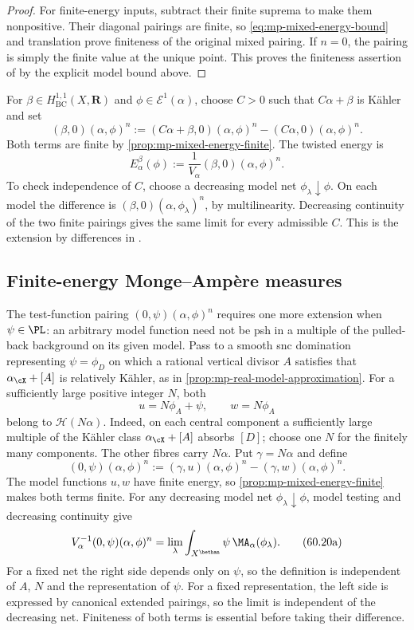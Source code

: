 \begin{proof}
For finite-energy inputs, subtract their finite suprema to make them nonpositive. Their diagonal pairings are finite, so \eqref{eq:mp-mixed-energy-bound} and translation prove finiteness of the original mixed pairing. If $n=0$, the pairing is simply the finite value at the unique point. This proves the finiteness assertion of \cite[Proposition~4.4.4, p.~43]{MPTropicalV2} by the explicit model bound above.
\end{proof}

For $\beta\in H^{1,1}_{\mathrm{BC}}(X,\mathbf R)$ and $\phi\in\mathcal E^1(\alpha)$, choose $C>0$ such that $C\alpha+\beta$ is K\"ahler and set
\[
 (\beta,0)(\alpha,\phi)^n
 :=(C\alpha+\beta,0)(\alpha,\phi)^n
      -(C\alpha,0)(\alpha,\phi)^n.
\]
Both terms are finite by \cref{prop:mp-mixed-energy-finite}. The twisted energy is
\[
 E^\beta_\alpha(\phi)
 :=\frac1{V_\alpha}(\beta,0)(\alpha,\phi)^n.
\tag{60.20}\label{eq:mp-twisted-energy}
\]
To check independence of $C$, choose a decreasing model net $\phi_\lambda\downarrow\phi$. On each model the difference is $(\beta,0)(\alpha,\phi_\lambda)^n$, by multilinearity. Decreasing continuity of the two finite pairings gives the same limit for every admissible $C$. This is the extension by differences in \cite[Definition~4.4.6, p.~43]{MPTropicalV2}.

\subsection{Finite-energy Monge--Amp\`ere measures}
\label{subsec:mp-psh-finite-energy-measures}

The test-function pairing $(0,\psi)(\alpha,\phi)^n$ requires one more extension when $\psi\in\PL$: an arbitrary model function need not be psh in a multiple of the pulled-back background on its given model. Pass to a smooth snc domination representing $\psi=\phi_D$ on which a rational vertical divisor $A$ satisfies that $\alpha_{\cX}+[A]$ is relatively K\"ahler, as in \cref{prop:mp-real-model-approximation}. For a sufficiently large positive integer $N$, both
\[
 u=N\phi_A+\psi,\qquad w=N\phi_A
\]
belong to $\mathcal H(N\alpha)$. Indeed, on each central component a sufficiently large multiple of the K\"ahler class $\alpha_{\cX}+[A]$ absorbs $[D]$; choose one $N$ for the finitely many components. The other fibres carry $N\alpha$. Put $\gamma=N\alpha$ and define
\[
 (0,\psi)(\alpha,\phi)^n
 :=(\gamma,u)(\alpha,\phi)^n
      -(\gamma,w)(\alpha,\phi)^n.
\]
The model functions $u,w$ have finite energy, so \cref{prop:mp-mixed-energy-finite} makes both terms finite. For any decreasing model net $\phi_\lambda\downarrow\phi$, model testing and decreasing continuity give
\[
 V_\alpha^{-1}(0,\psi)(\alpha,\phi)^n
   =\lim_\lambda\int_{X^{\bethan}}\psi\,\MA_\alpha(\phi_\lambda).
\tag{60.20a}\label{eq:mp-test-pairing-limit}
\]
For a fixed net the right side depends only on $\psi$, so the definition is independent of $A$, $N$ and the representation of $\psi$. For a fixed representation, the left side is expressed by canonical extended pairings, so the limit is independent of the decreasing net. Finiteness of both terms is essential before taking their difference.


